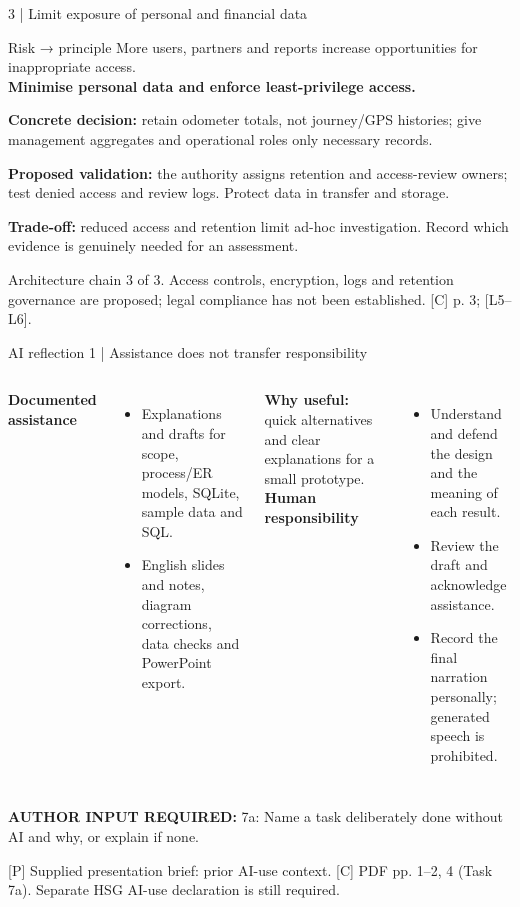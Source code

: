 \documentclass[10pt,aspectratio=169]{beamer}
\newcommand{\sources}[1]{\par\vfill{\fontsize{6.5}{7.8}\selectfont\color{muted}#1\par}}
\newcommand{\confirm}[1]{{\small\textbf{AUTHOR INPUT REQUIRED:} #1}}
\begin{document}
\begin{frame}{3 | Limit exposure of personal and financial data}
\begin{block}{Risk → principle}
More users, partners and reports increase opportunities for inappropriate access.\\
\textbf{Minimise personal data and enforce least-privilege access.}
\end{block}
\textbf{Concrete decision:} retain odometer totals, not journey/GPS histories; give management aggregates and operational roles only necessary records.
\par\medskip
\textbf{Proposed validation:} the authority assigns retention and access-review owners; test denied access and review logs. Protect data in transfer and storage.
\par\medskip
\textbf{Trade-off:} reduced access and retention limit ad-hoc investigation. Record which evidence is genuinely needed for an assessment.
\sources{Architecture chain 3 of 3. Access controls, encryption, logs and retention governance are proposed; legal compliance has not been established. [C] p. 3; [L5–L6].}
\end{frame}

\begin{frame}{AI reflection 1 | Assistance does not transfer responsibility}
\begin{columns}[T,onlytextwidth]
\textbf{Documented assistance}
\begin{itemize}\itemsep4pt
\item Explanations and drafts for scope, process/ER models, SQLite, sample data and SQL.
\item English slides and notes, diagram corrections, data checks and PowerPoint export.
\end{itemize}
\textbf{Why useful:} quick alternatives and clear explanations for a small prototype.
\textbf{Human responsibility}
\begin{itemize}\itemsep4pt
\item Understand and defend the design and the meaning of each result.
\item Review the draft and acknowledge assistance.
\item Record the final narration personally; generated speech is prohibited.
\end{itemize}
\end{columns}
\medskip
\confirm{7a: Name a task deliberately done without AI and why, or explain if none.}
\sources{[P] Supplied presentation brief: prior AI-use context. [C] PDF pp. 1–2, 4 (Task 7a). Separate HSG AI-use declaration is still required.}
\end{frame}
\end{document}
